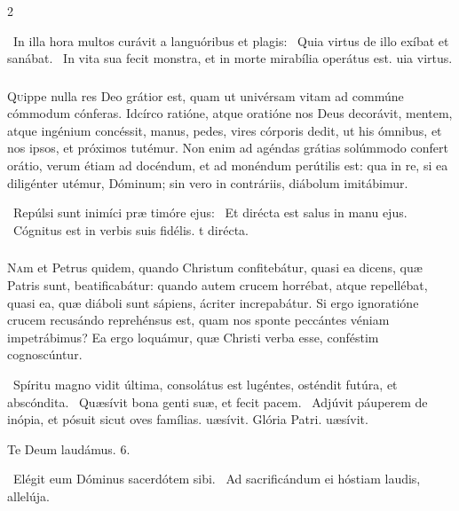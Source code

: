 \documentclass[9pt,twoside]{extarticle}
\begin{document}
\begin{multicols}{2}
\begin{tightlist}{}
\item {}~In illa hora multos curávit a languóribus et plagis: \textred{*}~Quia virtus de illo exíbat et sanábat. ~In vita sua fecit monstra, et in morte mirabília operátus est. uia virtus.
\end{tightlist}

\subsubsection*{\center {}}
\lettrine{Q}uippe nulla res Deo grátior est, quam ut univérsam vitam ad commúne cómmodum cónferas. Idcírco ratióne, atque oratióne nos Deus decorávit, mentem, atque ingénium concéssit, manus, pedes, vires córporis dedit, ut his ómnibus, et nos ipsos, et próximos tutémur. Non enim ad agéndas grátias solúmmodo confert orátio, verum étiam ad docéndum, et ad monéndum perútilis est: qua in re, si ea diligénter utémur, Dóminum; sin vero in contráriis, diábolum imitábimur.

\begin{tightlist}{}
\item {}~Repúlsi sunt inimíci præ timóre ejus: \textred{*}~Et dirécta est salus in manu ejus. ~Cógnitus est in verbis suis fidélis. t dirécta.
\end{tightlist}

\subsubsection*{\center {}}
\lettrine{N}am et Petrus quidem, quando Christum confitebátur, quasi ea dicens, quæ Patris sunt, beatificabátur: quando autem crucem horrébat, atque repellébat, quasi ea, quæ diáboli sunt sápiens, ácriter increpabátur. Si ergo ignoratióne crucem recusándo reprehénsus est, quam nos sponte peccántes véniam impetrábimus? Ea ergo loquámur, quæ Christi verba esse, conféstim cognoscúntur.

\begin{tightlist}{}
\item {}~Spíritu magno vidit última, consolátus est lugéntes, osténdit futúra, et abscóndita. \textred{*}~Quæsívit bona genti suæ, et fecit pacem. ~Adjúvit páuperem de inópia, et pósuit sicut oves famílias. uæsívit. Glória Patri. uæsívit.
\item Te Deum laudámus. 6.
\item {}~Elégit eum Dóminus sacerdótem sibi. ~Ad sacrificándum ei hóstiam laudis, allelúja.
\end{tightlist}


\end{multicols}
\end{document}

